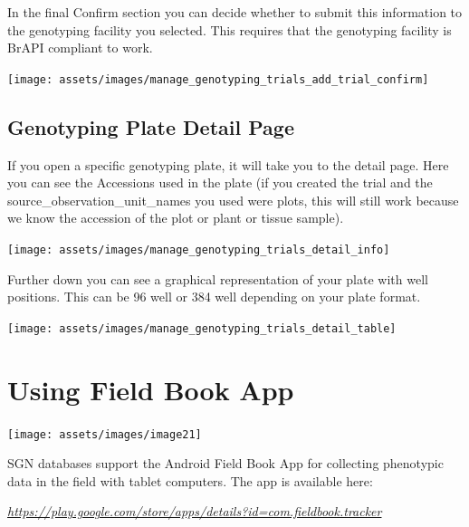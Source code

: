 \documentclass[
  12pt,
]{book}
\begin{document}
In the final Confirm section you can decide whether to submit this information to the genotyping facility you selected. This requires that the genotyping facility is BrAPI compliant to work.

\begin{center}\texttt{[image: assets/images/manage\_genotyping\_trials\_add\_trial\_confirm]} \end{center}

\hypertarget{genotyping-plate-detail-page}{%
\section{Genotyping Plate Detail Page}\label{genotyping-plate-detail-page}}

If you open a specific genotyping plate, it will take you to the detail page. Here you can see the Accessions used in the plate (if you created the trial and the source\_observation\_unit\_names you used were plots, this will still work because we know the accession of the plot or plant or tissue sample).

\begin{center}\texttt{[image: assets/images/manage\_genotyping\_trials\_detail\_info]} \end{center}

Further down you can see a graphical representation of your plate with well positions. This can be 96 well or 384 well depending on your plate format.

\begin{center}\texttt{[image: assets/images/manage\_genotyping\_trials\_detail\_table]} \end{center}

\hypertarget{using-fieldbook-app}{%
\chapter{Using Field Book App}\label{using-fieldbook-app}}

\begin{center}\texttt{[image: assets/images/image21]} \end{center}

SGN databases support the Android Field Book App for collecting phenotypic data in the field with tablet computers. The app is available here:

\href{https://play.google.com/store/apps/details?id=com.fieldbook.tracker}{\emph{https://play.google.com/store/apps/details?id=com.fieldbook.tracker}}
\end{document}
